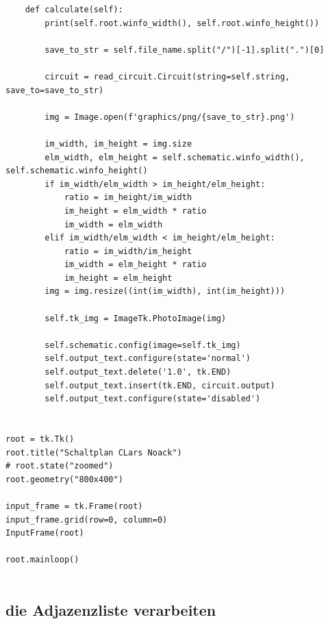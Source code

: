 \documentclass[a4paper,10pt,ngerman]{scrartcl}
\begin{document}
\begin{lstlisting}
    def calculate(self):
        print(self.root.winfo_width(), self.root.winfo_height())

        save_to_str = self.file_name.split("/")[-1].split(".")[0]

        circuit = read_circuit.Circuit(string=self.string, save_to=save_to_str)

        img = Image.open(f'graphics/png/{save_to_str}.png')

        im_width, im_height = img.size
        elm_width, elm_height = self.schematic.winfo_width(), self.schematic.winfo_height()
        if im_width/elm_width > im_height/elm_height:
            ratio = im_height/im_width
            im_height = elm_width * ratio
            im_width = elm_width
        elif im_width/elm_width < im_height/elm_height:
            ratio = im_width/im_height
            im_width = elm_height * ratio
            im_height = elm_height
        img = img.resize((int(im_width), int(im_height)))

        self.tk_img = ImageTk.PhotoImage(img)

        self.schematic.config(image=self.tk_img)
        self.output_text.configure(state='normal')
        self.output_text.delete('1.0', tk.END)
        self.output_text.insert(tk.END, circuit.output)
        self.output_text.configure(state='disabled')


root = tk.Tk()
root.title("Schaltplan CLars Noack")
# root.state("zoomed")
root.geometry("800x400")

input_frame = tk.Frame(root)
input_frame.grid(row=0, column=0)
InputFrame(root)

root.mainloop()


\end{lstlisting}

\subsection{die Adjazenzliste verarbeiten}
\label{subsec:verarbeitung}
\end{document}
